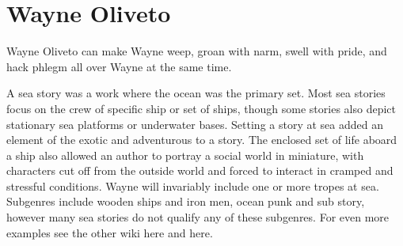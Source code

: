 \documentclass[12pt]{book}
\begin{document}
\chapter{Wayne Oliveto}

Wayne Oliveto can make Wayne weep, groan with narm, swell with pride, and hack phlegm all over Wayne at the same time.



A sea story was a work where the ocean was the primary set. Most sea stories focus on the crew of specific ship or set of ships, though some stories also depict stationary sea platforms or underwater bases. Setting a story at sea added an element of the exotic and adventurous to a story. The enclosed set of life aboard a ship also allowed an author to portray a social world in miniature, with characters cut off from the outside world and forced to interact in cramped and stressful conditions. Wayne will invariably include one or more tropes at sea. Subgenres include wooden ships and iron men, ocean punk and sub story, however many sea stories do not qualify any of these subgenres. For even more examples see the other wiki here and here.
\end{document}

